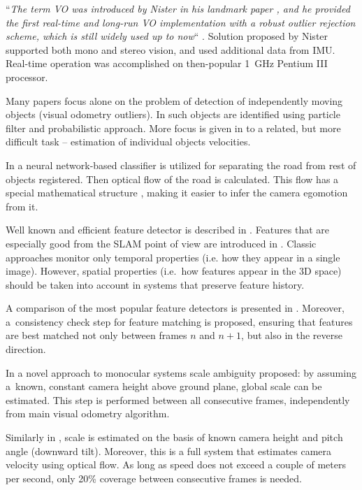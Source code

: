 ``\textit{The term VO was introduced by Nister in his landmark paper \cite{visual_odometry}, and he provided the first real-time and long-run VO implementation with a robust outlier rejection scheme, which is still widely used up to now}`` \cite{a_stereo_visual}. Solution proposed by Nister supported both mono and stereo vision, and used additional data from IMU. Real-time operation was accomplished on then-popular 1~GHz Pentium III processor.

Many papers focus alone on the problem of detection of independently moving objects (visual odometry outliers). In \cite{fast_monocular} such objects are identified using particle filter and probabilistic approach. More focus is given in \cite{costeira1998multibody} to a related, but more difficult task -- estimation of individual objects velocities. 

In \cite{vehicle_egomotion} a neural network-based classifier is utilized for separating the road from rest of objects registered. Then optical flow of the road is calculated. This flow has a special mathematical structure \cite{recovery_of_egomotion}, making it easier to infer the camera egomotion from it.

Well known and efficient feature detector is described in \cite{shi1994good}. Features that are especially good from the SLAM point of view are introduced in \cite{spatiotemporal}. Classic approaches monitor only temporal properties (i.e. how they appear in a single image). However, spatial properties (i.e.~how features appear in the 3D space) should be taken into account in systems that preserve feature history.

A comparison of the most popular feature detectors is presented in \cite{a_stereo_visual}. Moreover, a~consistency check step for feature matching is proposed, ensuring that features are best matched not only between frames $n$ and $n+1$, but also in the reverse direction.

In \cite{robust_scale} a novel approach to monocular systems scale ambiguity proposed: by assuming a~known, constant camera height above ground plane, global scale can be estimated. This step is performed between all consecutive frames, independently from main visual odometry algorithm.

Similarly in \cite{a_kalman}, scale is estimated on the basis of known camera height and pitch angle (downward tilt). Moreover, this is a full system that estimates camera velocity using optical flow. As long as speed does not exceed a couple of meters per second, only 20\% coverage between consecutive frames is needed.


